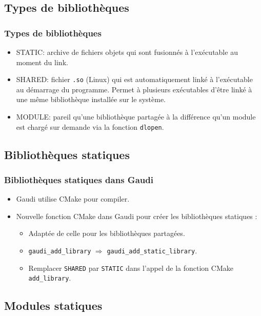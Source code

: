 \documentclass{beamer}
\begin{document}
\subsection{Types de bibliothèques}

\begin{frame}[fragile]
    \frametitle{Types de bibliothèques}

    \begin{itemize}
        \item STATIC: archive de fichiers objets qui sont fusionnés à l'exécutable au moment du link.
        \item SHARED: fichier \verb'.so' (Linux) qui est automatiquement linké à l'exécutable au démarrage du programme.
              Permet à plusieurs exécutables d'être linké à une même bibliothèque installée sur le système.
        \item MODULE: pareil qu'une bibliothèque partagée à la différence qu'un module est chargé sur demande via la fonction \verb'dlopen'.
    \end{itemize}
\end{frame}

\subsection{Bibliothèques statiques}

\begin{frame}[fragile]
    \frametitle{Bibliothèques statiques dans Gaudi}

    \begin{itemize}
        \item Gaudi utilise CMake pour compiler.
        \item Nouvelle fonction CMake dans Gaudi pour créer les bibliothèques statiques :
              \begin{itemize}
                  \item Adaptée de celle pour les bibliothèques partagées.
                  \item \verb'gaudi_add_library' $\Rightarrow$ \verb'gaudi_add_static_library'.
                  \item Remplacer \verb'SHARED' par \verb'STATIC' dans l'appel de la fonction CMake \verb'add_library'.
              \end{itemize}
    \end{itemize}
\end{frame}

\subsection{Modules statiques}
\end{document}
